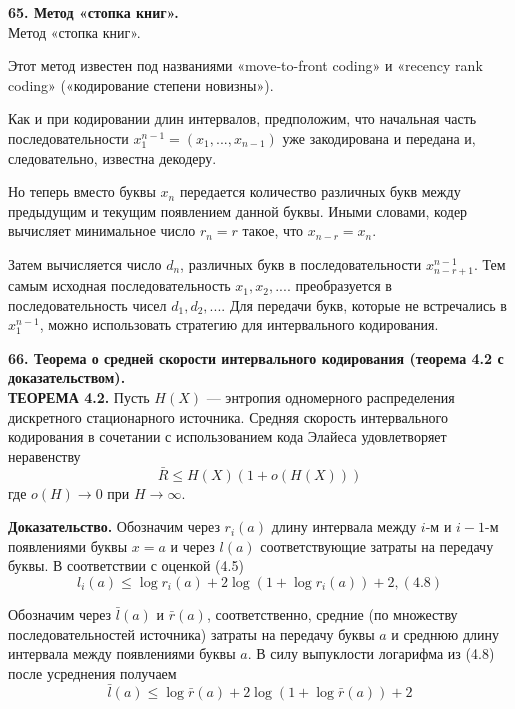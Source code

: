 \documentclass[14pt]{article}
\begin{document}
\bigskip
\textbf{65. Метод «стопка книг».} \\

Метод «стопка книг».

Этот метод известен под названиями «move-to-front coding» и «recency rank coding» («кодирование степени новизны»).

Как и при кодировании длин интервалов, предположим, что начальная часть последовательности \(x_1^{n-1} = (x_1,...,x_{n-1})\) уже закодирована и передана и, следовательно, известна декодеру.

Но теперь вместо буквы \(x_n\) передается количество различных букв  между предыдущим и текущим появлением данной буквы. Иными словами, кодер вычисляет минимальное число \(r_n = r\) такое, что \(x_{n-r} = x_n\).

Затем вычисляется число \(d_n\), различных букв в последовательности \(x_{n-r+1}^{n-1}\). Тем самым исходная последовательность \(x_1, x_2,....\) преобразуется в последовательность чисел \(d_1, d_2,....\) Для передачи букв, которые не встречались в \(x_1^{n-1}\), можно использовать стратегию для интервального кодирования.


\bigskip
\textbf{66. Теорема о средней скорости интервального кодирования (теорема 4.2 с доказательством).} \\

\textbf{ТЕОРЕМА 4.2.} Пусть \(H(X)\) — энтропия одномерного распределения дискретного стационарного источника. Средняя скорость интервального кодирования в сочетании с использованием кода Элайеса удовлетворяет неравенству
\begin{displaymath}
    \bar{R} \leq H(X)(1 + o(H(X)))
\end{displaymath}
где \(o(H) \to 0\) при \(H \to \infty\).

\textbf{Доказательство.} Обозначим через \(r_i(a)\) длину интервала между \(i\)-м и \(i-1\)-м появлениями буквы \(x = a\) и через \(l(a)\) соответствующие затраты на передачу буквы. В соответствии с оценкой (4.5)
\begin{displaymath}
    l_i(a) \leq \log r_i(a) + 2\log(1 + \log r_i(a)) + 2, (4.8)
\end{displaymath}

Обозначим через \(\bar{l}(a)\) и \(\bar{r}(a)\), соответственно, средние (по множеству последовательностей источника) затраты на передачу буквы \(a\) и среднюю длину интервала между появлениями буквы \(a\). В силу выпуклости логарифма из (4.8) после усреднения получаем
\begin{displaymath}
    \bar{l}(a) \leq \log \bar{r}(a) + 2\log(1 + \log \bar{r}(a)) + 2
\end{displaymath}
\end{document}
